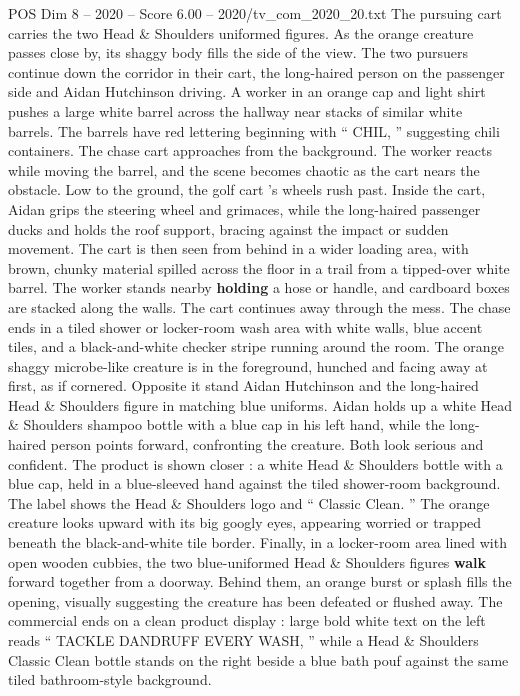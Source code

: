 \begin{textsample}{POS Dim 8 – 2020 – Score 6.00 – 2020/tv\_com\_2020\_20.txt}
The pursuing cart carries the two Head \& Shoulders uniformed figures.
As the orange creature passes close by, its shaggy body fills the side of the view.
The two pursuers continue down the corridor in their cart, the long-haired person on the passenger side and Aidan Hutchinson driving.
A worker in an orange cap and light shirt pushes a large white barrel across the hallway near stacks of similar white barrels.
The barrels have red lettering beginning with “ CHIL, ” suggesting chili containers.
The chase cart approaches from the background.
The worker reacts while moving the barrel, and the scene becomes chaotic as the cart nears the obstacle.
Low to the ground, the golf cart ’s wheels rush past.
Inside the cart, Aidan grips the steering wheel and grimaces, while the long-haired passenger ducks and holds the roof support, bracing against the impact or sudden movement.
The cart is then seen from behind in a wider loading area, with brown, chunky material spilled across the floor in a trail from a tipped-over white barrel.
The worker stands nearby \textbf{holding} a hose or handle, and cardboard boxes are stacked along the walls.
The cart continues away through the mess.
The chase ends in a tiled shower or locker-room wash area with white walls, blue accent tiles, and a black-and-white checker stripe running around the room.
The orange shaggy microbe-like creature is in the foreground, hunched and facing away at first, as if cornered.
Opposite it stand Aidan Hutchinson and the long-haired Head \& Shoulders figure in matching blue uniforms.
Aidan holds up a white Head \& Shoulders shampoo bottle with a blue cap in his left hand, while the long-haired person points forward, confronting the creature.
Both look serious and confident.
The product is shown closer : a white Head \& Shoulders bottle with a blue cap, held in a blue-sleeved hand against the tiled shower-room background.
The label shows the Head \& Shoulders logo and “ Classic Clean. ” The orange creature looks upward with its big googly eyes, appearing worried or trapped beneath the black-and-white tile border.
Finally, in a locker-room area lined with open wooden cubbies, the two blue-uniformed Head \& Shoulders figures \textbf{walk} forward together from a doorway.
Behind them, an orange burst or splash fills the opening, visually suggesting the creature has been defeated or flushed away.
The commercial ends on a clean product display : large bold white text on the left reads “ TACKLE DANDRUFF EVERY WASH, ” while a Head \& Shoulders Classic Clean bottle stands on the right beside a blue bath pouf against the same tiled bathroom-style background.

\end{textsample}
